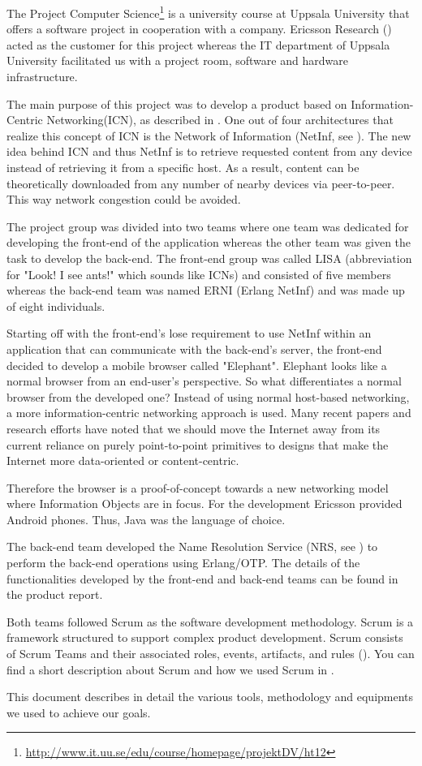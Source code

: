 The Project Computer Science\footnote{\url{http://www.it.uu.se/edu/course/homepage/projektDV/ht12}} is a university
course at Uppsala University that offers a software project in cooperation with a company. Ericsson Research (\cite{ericsson}) acted as 
the customer for this project whereas the IT department of Uppsala University facilitated us with a project room, software and hardware infrastructure.

The main purpose of this project was to develop a product based on Information-Centric Networking(ICN), as described in \cite{netinf}.
One out of four architectures that realize this concept of ICN is the Network of Information (NetInf, see \cite{netinf}). 
The new idea behind ICN and thus NetInf is to retrieve requested content from any device  instead of retrieving it from a specific host. 
As a result, content can be theoretically downloaded from any number of nearby devices via peer-to-peer. 
This way network congestion could be avoided.

The project group was divided into two teams where one team was dedicated for developing the front-end of the 
application whereas the other team was given the task to develop the back-end. The front-end group was called 
LISA (abbreviation for "Look! I see ants!" which sounds like ICNs) and consisted of five members whereas 
the back-end team was named ERNI (Erlang NetInf) and was made up of eight individuals. 

Starting off with the front-end's lose requirement to use NetInf within an application that can communicate with
the back-end's server, the front-end decided to develop a mobile browser called "Elephant". 
Elephant looks like a normal browser from an end-user's perspective. So what differentiates a 
normal browser from the developed one? Instead of using normal host-based networking, a more information-centric networking approach is used. 
Many recent papers and research efforts have noted that we should move the Internet 
away from its current reliance on purely point-to-point primitives to designs that make the Internet more data-oriented or content-centric. \cite{ghodsietal}  

Therefore the browser is a proof-of-concept towards a new networking model where Information Objects are in focus.
For the development Ericsson provided Android phones. Thus, Java was the language of choice.

The back-end team developed the Name Resolution Service (NRS, see \cite{netinf}) to perform the back-end operations using Erlang/OTP\cite{erlang}. 
The details of the functionalities developed 
by the front-end and back-end teams can be found in the product report. 

Both teams followed Scrum as the software development methodology. Scrum is a framework structured to support complex product development. Scrum consists of
Scrum Teams and their associated roles, events, artifacts, and rules (\cite{scrumpaper}).
You can find a short description about Scrum and
how we used Scrum in .

This document describes in detail the various tools, methodology and equipments we used to achieve our goals. 
